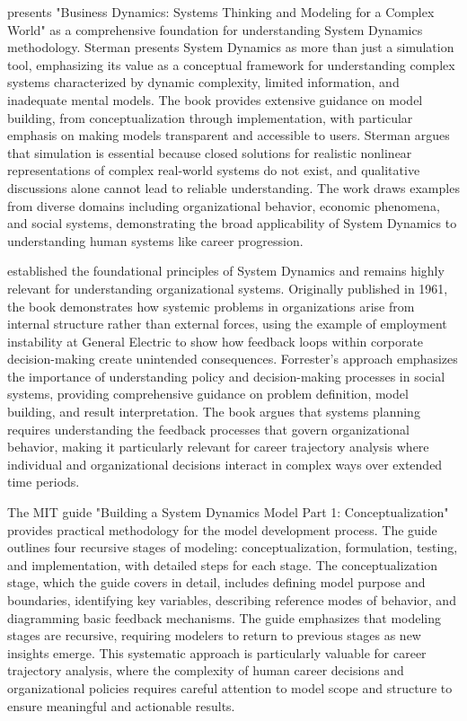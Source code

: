 \documentclass[main.tex]{subfiles}
\begin{document}
\textcite{sterman_review} presents "Business Dynamics: Systems Thinking and Modeling for a Complex World" as a comprehensive foundation for understanding System Dynamics methodology. Sterman presents System Dynamics as more than just a simulation tool, emphasizing its value as a conceptual framework for understanding complex systems characterized by dynamic complexity, limited information, and inadequate mental models. The book provides extensive guidance on model building, from conceptualization through implementation, with particular emphasis on making models transparent and accessible to users. Sterman argues that simulation is essential because closed solutions for realistic nonlinear representations of complex real-world systems do not exist, and qualitative discussions alone cannot lead to reliable understanding. The work draws examples from diverse domains including organizational behavior, economic phenomena, and social systems, demonstrating the broad applicability of System Dynamics to understanding human systems like career progression.


\textcite{industrial_dynamics} established the foundational principles of System Dynamics and remains highly relevant for understanding organizational systems. Originally published in 1961, the book demonstrates how systemic problems in organizations arise from internal structure rather than external forces, using the example of employment instability at General Electric to show how feedback loops within corporate decision-making create unintended consequences. Forrester's approach emphasizes the importance of understanding policy and decision-making processes in social systems, providing comprehensive guidance on problem definition, model building, and result interpretation. The book argues that systems planning requires understanding the feedback processes that govern organizational behavior, making it particularly relevant for career trajectory analysis where individual and organizational decisions interact in complex ways over extended time periods.


The MIT guide "Building a System Dynamics Model Part 1: Conceptualization" provides practical methodology for the model development process\parencite{building_model}. The guide outlines four recursive stages of modeling: conceptualization, formulation, testing, and implementation, with detailed steps for each stage. The conceptualization stage, which the guide covers in detail, includes defining model purpose and boundaries, identifying key variables, describing reference modes of behavior, and diagramming basic feedback mechanisms. The guide emphasizes that modeling stages are recursive, requiring modelers to return to previous stages as new insights emerge. This systematic approach is particularly valuable for career trajectory analysis, where the complexity of human career decisions and organizational policies requires careful attention to model scope and structure to ensure meaningful and actionable results.
\end{document}
